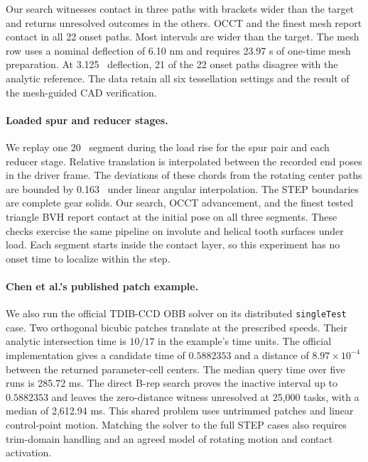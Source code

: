 Our search witnesses contact in three paths with brackets wider than the target and returns unresolved outcomes in the others. OCCT and the finest mesh report contact in all 22 onset paths. Most intervals are wider than the target. The mesh row uses a nominal deflection of 6.10 nm and requires 23.97 s of one-time mesh preparation. At 3.125~\micron{} deflection, 21 of the 22 onset paths disagree with the analytic reference. The data retain all six tessellation settings and the result of the mesh-guided CAD verification.



\paragraph{Loaded spur and reducer stages.}
We replay one 20~\microsec{} segment during the load rise for the spur pair and each reducer stage. Relative translation is interpolated between the recorded end poses in the driver frame. The deviations of these chords from the rotating center paths are bounded by 0.163~\micron{} under linear angular interpolation. The STEP boundaries are complete gear solids. Our search, OCCT advancement, and the finest tested triangle BVH report contact at the initial pose on all three segments. These checks exercise the same pipeline on involute and helical tooth surfaces under load. Each segment starts inside the contact layer, so this experiment has no onset time to localize within the step.

\paragraph{Chen et al.'s published patch example.}
We also run the official TDIB-CCD OBB solver \citep{chen2024} on its distributed \texttt{singleTest} case. Two orthogonal bicubic patches translate at the prescribed speeds. Their analytic intersection time is $10/17$ in the example's time units. The official implementation gives a candidate time of $0.5882353$ and a distance of $8.97\times10^{-4}$ between the returned parameter-cell centers. The median query time over five runs is 285.72 ms. The direct B-rep search proves the inactive interval up to $0.5882353$ and leaves the zero-distance witness unresolved at 25,000 tasks, with a median of 2,612.94 ms. This shared problem uses untrimmed patches and linear control-point motion. Matching the solver to the full STEP cases also requires trim-domain handling and an agreed model of rotating motion and contact activation.
\FloatBarrier
